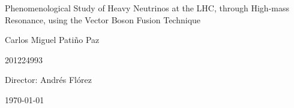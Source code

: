 \documentclass[12pt]{article}
\begin{document}
\begin{center}
\Huge
Phenomenological Study of Heavy Neutrinos at the LHC, through High-mass Resonance, using the Vector Boson Fusion Technique

\vspace{3mm}
\Large Carlos Miguel Patiño Paz

\large
201224993


\vspace{2mm}
\Large
Director: Andrés Flórez

\normalsize
\vspace{2mm}

\today
\end{center}


\normalsize






\end{document}
